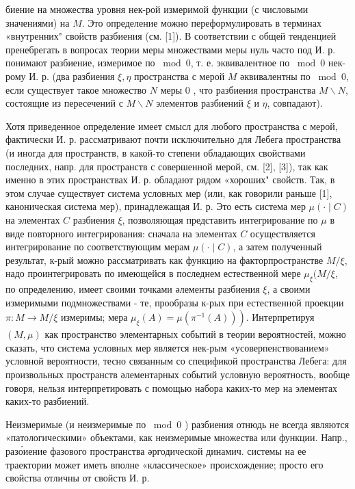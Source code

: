 \documentclass[10pt]{article}
\begin{document}
биение на множества уровня нек-рой измеримой функции (с числовыми значениями) на $M$. Это определение можно переформулировать в терминах «внутренних" свойств разбиения (см. [1]). В соответствии с общей тенденцией пренебрегать в вопросах теории меры множествами меры нуль часто под И. р. понимают разбиение, измеримое по $\bmod 0$, т. е. эквивалентное по $\bmod 0$ нек-рому И. р. (два разбиения $\xi, \eta$ пространства с мерой $M$ әквивалентны по $\bmod 0$, если существует такое множество $N$ меры 0 , что разбиения пространства $M \backslash N$, состоящие из пересечений с $M \backslash N$ элементов разбиений $\xi$ и $\eta$, совпадают).



Хотя приведенное определение имеет смысл для любого пространства с мерой, фактически И. р. рассматривают почти исключительно для Лебега пространства (и иногда для пространств, в какой-то степени обладающих свойствами последних, напр. для пространств с совершенной мерой, см. [2], [3]), так как именно в этих пространствах И. р. обладают рядом «хороших" свойств. Так, в этом случае существует система условных мер (или, как говорили раньше [1], каноническая система мер), принадлежащая И. р. Это есть система мер $\mu(\cdot \mid C)$ на элементах $C$ разбиения $\xi$, позволяющая представить интегрирование по $\mu$ в виде повторного интегрирования: сначала на элементах $C$ осуществляется интегрирование по соответствующим мерам $\mu(\cdot \mid C)$, а затем полученный результат, к-рый можно рассматривать как функцию на факторпространстве $M / \xi$, надо проинтегрировать по имеющейся в последнем естественной мере $\mu_{\xi}(M / \xi$, по определению, имеет своими точками әлементы разбиения $\xi$, а своими измеримыми подмножествами - те, прообразы к-рых при естественной проекции $\pi: M \rightarrow M / \xi$ измеримы; мера $\left.\mu_{\xi}(A)=\mu\left(\pi^{-1}(A)\right)\right)$. Интерпретируя $(M, \mu)$ как пространство элементарных событий в теории вероятностей, можно сказать, что система условных мер является нек-рым «усоверпенствованием» условной вероятности, тесно связанным со спецификой пространства Лебега: для произвольных пространств әлементарных событий условную вероятность, вообще говоря, нельзя интерпретировать с помощью набора каких-то мер на элементах каких-то разбиений.



Неизмеримые (и неизмеримые по $\bmod 0$ ) разбиения отнюдь не всегда являются «патологическими» объектами, как неизмеримые множества или функции. Напр., разо́иение фазового пространства әргодической динамич. системы на ее траектории может иметь вполне «классическое» происхождение; просто его свойства отличны от свойств И. р.
\end{document}
